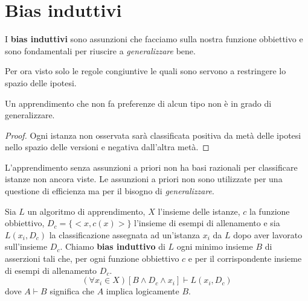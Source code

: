 \section{Bias induttivi}
I \textbf{bias induttivi} sono assunzioni che facciamo sulla nostra funzione obbiettivo e sono fondamentali per
riuscire a \emph{generalizzare} bene.

Per ora visto solo le regole congiuntive le quali sono servono a restringere lo spazio delle ipotesi.

\begin{theorem}
	Un apprendimento che non fa preferenze di alcun tipo non \`e in grado di generalizzare.
	\begin{proof}
		Ogni istanza non osservata sar\`a classificata positiva da met\`a delle ipotesi nello spazio delle versioni e
		negativa dall'altra met\`a.
	\end{proof}
\end{theorem}

L'apprendimento senza assunzioni a priori non ha basi razionali per classificare istanze non ancora viste. Le assunzioni
a priori non sono utilizzate per una questione di efficienza ma per il bisogno di \emph{generalizzare}.

\begin{definition}
	Sia $L$ un algoritmo di apprendimento, $X$ l'insieme delle istanze, $c$ la funzione obbiettivo,
	$D_c = \{<x, c(x)>\}$ l'insieme di esempi di allenamento e sia $L(x_i, D_c)$ la classificazione assegnata ad
	un'istanza $x_i$ da $L$ dopo aver lavorato sull'insieme $D_c$. Chiamo \textbf{bias induttivo} di $L$ ogni minimo
	insieme $B$ di asserzioni tali che, per ogni funzione obbiettivo $c$ e per il corrispondente insieme di esempi di
	allenamento $D_c$.
	\[ (\forall x_i \in X) [B \wedge D_c \wedge x_i] \vdash L(x_i, D_c) \]
	dove $A \vdash B$ significa che $A$ implica logicamente $B$.
\end{definition}